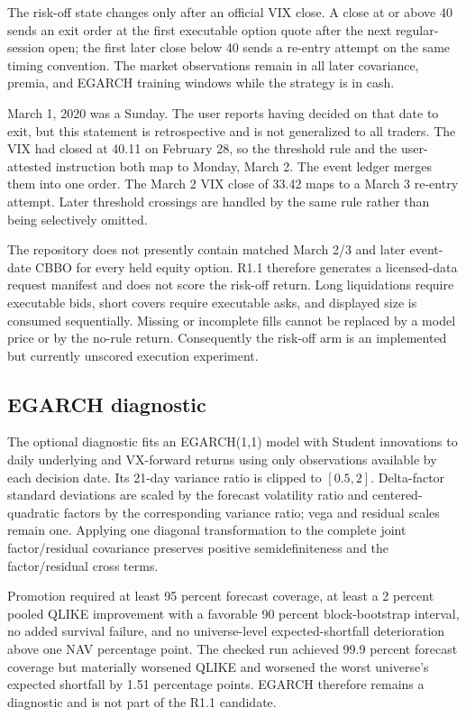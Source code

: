 The risk-off state changes only after an official VIX close. A close at or above 40 sends
an exit order at the first executable option quote after the next regular-session open;
the first later close below 40 sends a re-entry attempt on the same timing convention.
The market observations remain in all later covariance, premia, and EGARCH training
windows while the strategy is in cash.

March 1, 2020 was a Sunday. The user reports having decided on that date to exit, but this
statement is retrospective and is not generalized to all traders. The VIX had closed at
40.11 on February 28, so the threshold rule and the user-attested instruction both map to
Monday, March 2. The event ledger merges them into one order. The March 2 VIX close of
33.42 maps to a March 3 re-entry attempt. Later threshold crossings are handled by the same
rule rather than being selectively omitted.

The repository does not presently contain matched March 2/3 and later event-date CBBO for
every held equity option. R1.1 therefore generates a licensed-data request manifest and
does not score the risk-off return. Long liquidations require executable bids, short covers
require executable asks, and displayed size is consumed sequentially. Missing or incomplete
fills cannot be replaced by a model price or by the no-rule return. Consequently the
risk-off arm is an implemented but currently unscored execution experiment.

\subsection{EGARCH diagnostic}

The optional diagnostic fits an EGARCH(1,1) model with Student innovations to daily
underlying and VX-forward returns using only observations available by each decision date.
Its 21-day variance ratio is clipped to $[0.5,2]$. Delta-factor standard deviations are
scaled by the forecast volatility ratio and centered-quadratic factors by the corresponding
variance ratio; vega and residual scales remain one. Applying one diagonal transformation
to the complete joint factor/residual covariance preserves positive semidefiniteness and
the factor/residual cross terms.

Promotion required at least 95 percent forecast coverage, at least a 2 percent pooled QLIKE
improvement with a favorable 90 percent block-bootstrap interval, no added survival
failure, and no universe-level expected-shortfall deterioration above one NAV percentage
point. The checked run achieved 99.9 percent forecast coverage but materially worsened
QLIKE and worsened the worst universe's expected shortfall by 1.51 percentage points.
EGARCH therefore remains a diagnostic and is not part of the R1.1 candidate.


